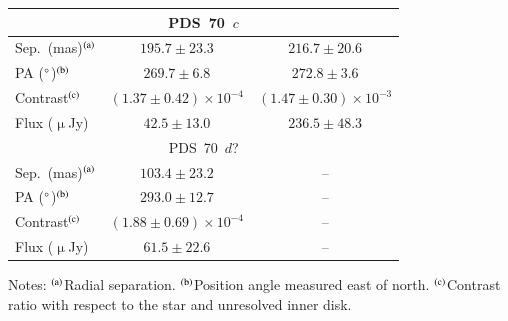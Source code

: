 \documentclass[longauth]{aa}
\newcommand{\vc}[1]{#1}
\begin{document}
\begin{table}
\begin{center}
\begin{tabular}{lcc}
\hline
\multicolumn{3}{c}{PDS~70~$c$}\\
\hline
Sep.\ (mas)$^{\rm (a)}$ & $195.7 \pm 23.3 $ & $216.7 \pm 20.6$\\
PA ($^\circ$)$^{\rm (b)}$ & $269.7 \pm 6.8$ & $272.8 \pm 3.6$ \\  %
Contrast$^{\rm (c)}$ & $(1.37 \pm 0.42) %
\times 10^{-4}$ & $(1.47 \pm 0.30) \times 10^{-3}$\\
Flux ($\upmu$Jy) & $42.5 \pm 13.0$ %
& $ 236.5 \pm 48.3$\\
\hline
\multicolumn{3}{c}{PDS~70~$d$?}\\
\hline
Sep.\ (mas)$^{\rm (a)}$ & $103.4 \pm 23.2 $ & -- \\
PA ($^\circ$)$^{\rm (b)}$ & $293.0 \pm 12.7$ & -- \\  %
Contrast$^{\rm (c)}$ & $(1.88 \pm 0.69) \times 10^{-4}$ & -- \\
Flux ($\upmu$Jy) & $61.5 \pm 22.6$ & -- \\
\hline
\end{tabular}
\end{center}\addvspace{-0.7em}
{\small%
Notes: %
$^{\rm (a)}$Radial separation. $^{\rm (b)}$Position angle measured east of north. $^{\rm (c)}$Contrast ratio with respect to the star and unresolved inner disk. %
}
\end{table}
    
\end{document}
